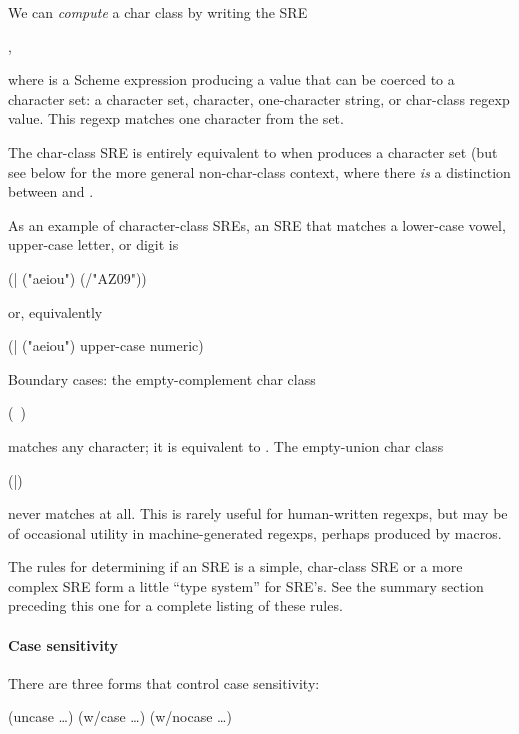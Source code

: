 We can \emph{compute} a char class by writing the SRE 
\begin{code}
,\end{code}%
%
where  is a Scheme expression producing a value that can be
coerced to a character set: a character set, character, one-character
string, or char-class regexp value. This regexp matches one character
from the set.

The char-class SRE  is entirely equivalent to 
when  produces a character set (but see below for the more
general non-char-class context, where there \emph{is} a distinction between
 and .

As an example of character-class SREs, 
an SRE that matches a lower-case vowel, upper-case letter, or digit is
\begin{code}
(| ("aeiou") (/"AZ09"))\end{code}%
%
or, equivalently
\begin{code}
(| ("aeiou") upper-case numeric)\end{code}%
%
Boundary cases: the empty-complement char class
\begin{code}
(~)\end{code}%
%
matches any character; it is equivalent to .
The empty-union char class
\begin{code}
(|)\end{code}%
%
never matches at all. This is rarely useful for human-written regexps,
but may be of occasional utility in machine-generated regexps, perhaps
produced by macros.

The rules for determining if an SRE is a simple, char-class SRE or a
more complex SRE form a little ``type system'' for SRE's. See the summary
section preceding this one for a complete listing of these rules.


\paragraph{Case sensitivity}

There are three forms that control case sensitivity:
\begin{code}
(uncase    \ldots)
(w/case    \ldots)
(w/nocase  \ldots)\end{code}%
%

